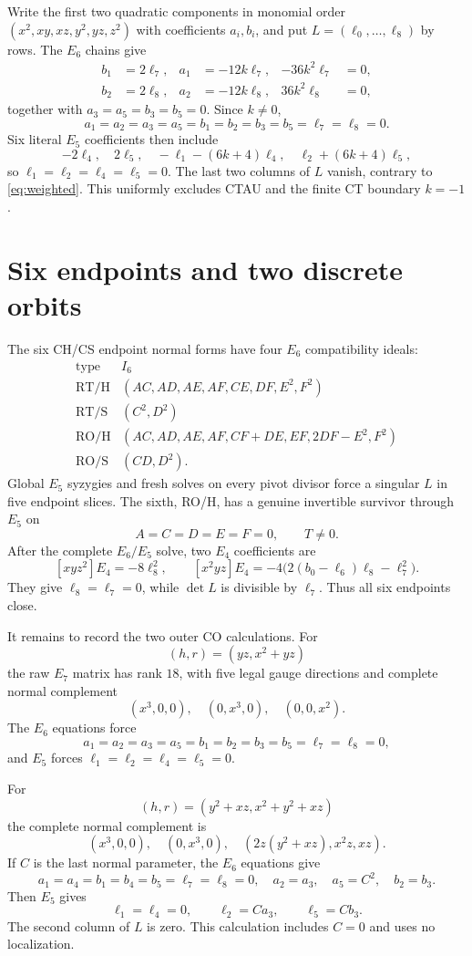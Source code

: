 \documentclass[11pt]{article}
\theoremstyle{remark}
\begin{document}
Write the first two quadratic components in monomial order
$(x^2,xy,xz,y^2,yz,z^2)$ with coefficients $a_i,b_i$, and put
$L=(\ell_0,\ldots,\ell_8)$ by rows.  The $E_6$ chains give
\[
\begin{aligned}
b_1&=2\ell_7,&a_1&=-12k\ell_7,&-36k^2\ell_7&=0,\\
b_2&=2\ell_8,&a_2&=-12k\ell_8,& 36k^2\ell_8&=0,
\end{aligned}
\]
together with $a_3=a_5=b_3=b_5=0$.  Since $k\ne0$,
\[
a_1=a_2=a_3=a_5=b_1=b_2=b_3=b_5=\ell_7=\ell_8=0.
\]
Six literal $E_5$ coefficients then include
\[
-2\ell_4,\quad2\ell_5,\quad
-\ell_1-(6k+4)\ell_4,\quad
\ell_2+(6k+4)\ell_5,
\]
so $\ell_1=\ell_2=\ell_4=\ell_5=0$.  The last two columns of $L$
vanish, contrary to \eqref{eq:weighted}.  This uniformly excludes CTAU
and the finite CT boundary $k=-1$.

\section{Six endpoints and two discrete orbits}

The six CH/CS endpoint normal forms have four $E_6$ compatibility ideals:
\[
\begin{array}{c|l}
\text{type}&I_6\\ \hline
\mathrm{RT/H}&(AC,AD,AE,AF,CE,DF,E^2,F^2)\\
\mathrm{RT/S}&(C^2,D^2)\\
\mathrm{RO/H}&(AC,AD,AE,AF,CF+DE,EF,2DF-E^2,F^2)\\
\mathrm{RO/S}&(CD,D^2).
\end{array}
\]
Global $E_5$ syzygies and fresh solves on every pivot divisor force a
singular $L$ in five endpoint slices.  The sixth, RO/H, has a genuine
invertible survivor through $E_5$ on
\[
A=C=D=E=F=0,\qquad T\ne0.
\]
After the complete $E_6/E_5$ solve, two $E_4$ coefficients are
\[
[xyz^2]E_4=-8\ell_8^2,\qquad
[x^2yz]E_4=-4\bigl(2(b_0-\ell_6)\ell_8-\ell_7^2\bigr).
\]
They give $\ell_8=\ell_7=0$, while $\det L$ is divisible by $\ell_7$.
Thus all six endpoints close.

It remains to record the two outer CO calculations.  For
\[
(h,r)=(yz,x^2+yz)
\]
the raw $E_7$ matrix has rank $18$, with five legal gauge directions and
complete normal complement
\[
(x^3,0,0),\quad(0,x^3,0),\quad(0,0,x^2).
\]
The $E_6$ equations force
\[
a_1=a_2=a_3=a_5=b_1=b_2=b_3=b_5=\ell_7=\ell_8=0,
\]
and $E_5$ forces
$\ell_1=\ell_2=\ell_4=\ell_5=0$.

For
\[
(h,r)=(y^2+xz,x^2+y^2+xz)
\]
the complete normal complement is
\[
(x^3,0,0),\quad(0,x^3,0),\quad
(2z(y^2+xz),x^2z,xz).
\]
If $C$ is the last normal parameter, the $E_6$ equations give
\[
a_1=a_4=b_1=b_4=b_5=\ell_7=\ell_8=0,\quad
a_2=a_3,\quad a_5=C^2,\quad b_2=b_3.
\]
Then $E_5$ gives
\[
\ell_1=\ell_4=0,\qquad
\ell_2=Ca_3,\qquad\ell_5=Cb_3.
\]
The second column of $L$ is zero.  This calculation includes $C=0$ and
uses no localization.
\end{document}
